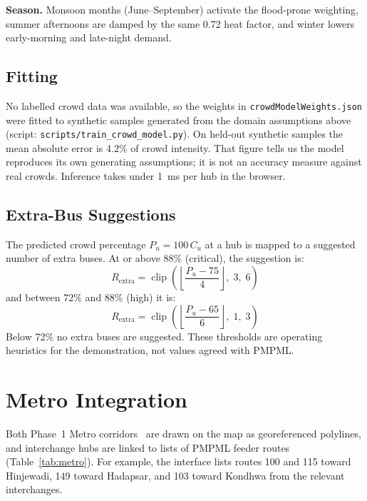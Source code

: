 \documentclass[conference]{IEEEtran}
\begin{document}
\textbf{Season.} Monsoon months (June--September) activate the flood-prone weighting, summer afternoons are damped by the same 0.72 heat factor, and winter lowers early-morning and late-night demand.

\subsection{Fitting}
No labelled crowd data was available, so the weights in \texttt{crowdModelWeights.json} were fitted to synthetic samples generated from the domain assumptions above (script: \texttt{scripts/train\_crowd\_model.py}). On held-out synthetic samples the mean absolute error is 4.2\% of crowd intensity. That figure tells us the model reproduces its own generating assumptions; it is not an accuracy measure against real crowds. Inference takes under 1~ms per hub in the browser.

\subsection{Extra-Bus Suggestions}
The predicted crowd percentage $P_u = 100\,C_u$ at a hub is mapped to a suggested number of extra buses. At or above 88\% (critical), the suggestion is:
\begin{equation}
R_{\text{extra}} = \operatorname{clip}\!\left(\left\lfloor\frac{P_u - 75}{4}\right\rfloor,\; 3,\; 6\right)
\label{eq:bus_critical}
\end{equation}
and between 72\% and 88\% (high) it is:
\begin{equation}
R_{\text{extra}} = \operatorname{clip}\!\left(\left\lfloor\frac{P_u - 65}{6}\right\rfloor,\; 1,\; 3\right)
\label{eq:bus_high}
\end{equation}
Below 72\% no extra buses are suggested. These thresholds are operating heuristics for the demonstration, not values agreed with PMPML.

\section{Metro Integration}

Both Phase~1 Metro corridors~\cite{mahamecro2024} are drawn on the map as georeferenced polylines, and interchange hubs are linked to lists of PMPML feeder routes (Table~\ref{tab:metro}). For example, the interface lists routes 100 and 115 toward Hinjewadi, 149 toward Hadapsar, and 103 toward Kondhwa from the relevant interchanges.
\end{document}
